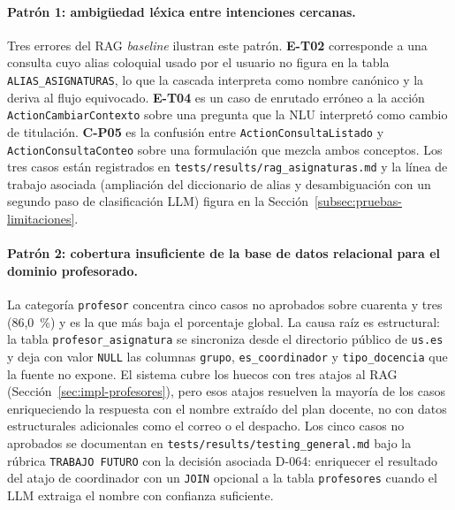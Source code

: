 \paragraph{Patrón 1: ambigüedad léxica entre intenciones cercanas.} Tres errores del RAG \textit{baseline} ilustran este patrón. \textbf{E-T02} corresponde a una consulta cuyo alias coloquial usado por el usuario no figura en la tabla \texttt{ALIAS\_ASIGNATURAS}, lo que la cascada interpreta como nombre canónico y la deriva al flujo equivocado. \textbf{E-T04} es un caso de enrutado erróneo a la acción \texttt{ActionCambiarContexto} sobre una pregunta que la NLU interpretó como cambio de titulación. \textbf{C-P05} es la confusión entre \texttt{ActionConsultaListado} y \texttt{ActionConsultaConteo} sobre una formulación que mezcla ambos conceptos. Los tres casos están registrados en \texttt{tests/results/rag\_asignaturas.md} y la línea de trabajo asociada (ampliación del diccionario de alias y desambiguación con un segundo paso de clasificación LLM) figura en la Sección~\ref{subsec:pruebas-limitaciones}.

\paragraph{Patrón 2: cobertura insuficiente de la base de datos relacional para el dominio profesorado.} La categoría \texttt{profesor} concentra cinco casos no aprobados sobre cuarenta y tres (86,0~\%) y es la que más baja el porcentaje global. La causa raíz es estructural: la tabla \texttt{profesor\_asignatura} se sincroniza desde el directorio público de \texttt{us.es} y deja con valor \texttt{NULL} las columnas \texttt{grupo}, \texttt{es\_coordinador} y \texttt{tipo\_docencia} que la fuente no expone. El sistema cubre los huecos con tres atajos al RAG (Sección~\ref{sec:impl-profesores}), pero esos atajos resuelven la mayoría de los casos enriqueciendo la respuesta con el nombre extraído del plan docente, no con datos estructurales adicionales como el correo o el despacho. Los cinco casos no aprobados se documentan en \texttt{tests/results/testing\_general.md} bajo la rúbrica \texttt{TRABAJO FUTURO} con la decisión asociada D-064: enriquecer el resultado del atajo de coordinador con un \texttt{JOIN} opcional a la tabla \texttt{profesores} cuando el LLM extraiga el nombre con confianza suficiente.

